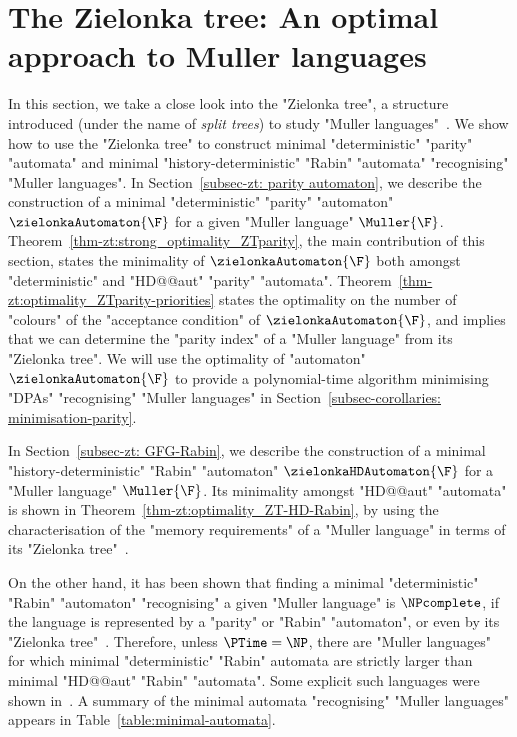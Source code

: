 \documentclass{theoretics}
\begin{document}
	\section{The Zielonka tree: An optimal approach to Muller languages}\label{section:zielonka-tree}
	In this section, we take a close look into the "Zielonka tree", a structure introduced (under the name of \emph{split trees}) to study "Muller languages"~\cite{Zielonka1998infinite}.
We show how to use the "Zielonka tree" to construct minimal "deterministic" "parity" "automata" and minimal "history-deterministic" "Rabin" "automata" "recognising" "Muller languages".
In Section~\ref{subsec-zt: parity automaton}, we describe the construction of a minimal "deterministic" "parity" "automaton" $\zielonkaAutomaton{\F}$ for a given "Muller language" $\Muller{\F}$. Theorem~\ref{thm-zt:strong_optimality_ZTparity}, the main contribution of this section, states the minimality of $\zielonkaAutomaton{\F}$ both amongst "deterministic" and "HD@@aut" "parity" "automata". Theorem~\ref{thm-zt:optimality_ZTparity-priorities} states the optimality on the number of "colours" of the "acceptance condition" of $\zielonkaAutomaton{\F}$, and implies that we can determine the "parity index" of a "Muller language" from its "Zielonka tree".
We will use the optimality of "automaton" $\zielonkaAutomaton{\F}$ to provide a polynomial-time algorithm minimising "DPAs" "recognising" "Muller languages" in Section~\ref{subsec-corollaries: minimisation-parity}.

In Section~\ref{subsec-zt: GFG-Rabin}, we describe the construction of a minimal "history-deterministic" "Rabin" "automaton" $\zielonkaHDAutomaton{\F}$ for a "Muller language" $\Muller{\F}$. Its minimality amongst "HD@@aut" "automata" is shown in Theorem~\ref{thm-zt:optimality_ZT-HD-Rabin}, by using the characterisation of the "memory requirements" of a "Muller language" in terms of its "Zielonka tree"~\cite{DJW1997memory}.

On the other hand, it has been shown that finding a minimal "deterministic" "Rabin" "automaton" "recognising" a given "Muller language" is $\NPcomplete$, if the language is represented by a "parity" or "Rabin" "automaton", or even by its "Zielonka tree"~\cite{Casares2021Chromatic}.
Therefore, unless $\PTime = \NP$, there are "Muller languages" for which minimal "deterministic" "Rabin" automata are strictly larger than minimal "HD@@aut" "Rabin" "automata". Some explicit such languages were shown in~\cite[Section~4]{CCL22SizeGFG}.
A summary of the minimal automata "recognising" "Muller languages" appears in Table~\ref{table:minimal-automata}.
\end{document}
